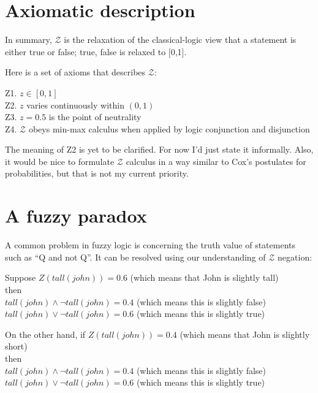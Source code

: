 \section{Axiomatic description}
\label{sec:fuzziness-axioms}

In summary, $\mathcal{Z}$ is the relaxation of the classical-logic view that a statement is either true or false;  {true, false} is relaxed to [0,1].

Here is a set of axioms that describes $\mathcal{Z}$:

Z1. $z \in [0,1]$ \\
Z2. $z$ varies continuously within $(0,1)$ \\
Z3. $z=0.5$ is the point of neutrality\\
Z4. $\mathcal{Z}$ obeys min-max calculus when applied by logic conjunction and disjunction

The meaning of Z2 is yet to be clarified.  For now I'd just state it informally.  Also, it would be nice to formulate $\mathcal{Z}$ calculus in a way similar to Cox's postulates for probabilities, but that is not my current priority.

\section{A fuzzy paradox}

A common problem in fuzzy logic is concerning the truth value of statements such as ``Q and not Q''.  It can be resolved using our understanding of $\mathcal{Z}$ negation:

Suppose $Z(tall(john)) = 0.6$ (which means that John is slightly tall)\\
then\\
\hspace*{1cm} $ tall(john) \wedge \neg tall(john) = 0.4$ (which means this is slightly false)\\
\hspace*{1cm} $ tall(john) \vee \neg tall(john) = 0.6$ (which means this is slightly true)

On the other hand, if $Z(tall(john)) = 0.4$ (which means that John is slightly short)\\
then\\
\hspace*{1cm} $ tall(john) \wedge \neg tall(john) = 0.4$ (which means this is slightly false)\\
\hspace*{1cm} $ tall(john) \vee \neg tall(john) = 0.6$ (which means this is slightly true)

